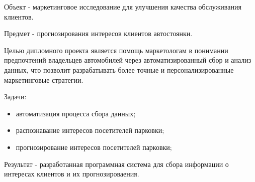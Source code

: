 Объект - маркетинговое исследование для улучшения качества обслуживания клиентов.


Предмет - прогнозирования интересов клиентов автостоянки.

Целью дипломного проекта является помощь маркетологам в понимании предпочтений владельцев автомобилей через автоматизированный сбор и анализ данных, что позволит разрабатывать более точные и персонализированные маркетинговые стратегии. 

Задачи:
\begin{itemize}
    \item автоматизация процесса сбора данных;
    \item распознавание интересов посетителей парковки;
    \item прогнозирование интересов посетителей парковки;
\end{itemize}

Результат - разработанная программная система для сбора информации о интересах клиентов и их прогнозироваения. 